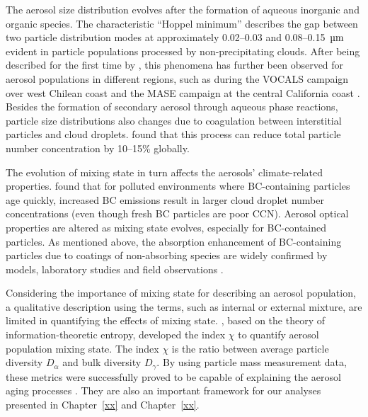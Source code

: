 \documentclass[edeposit,fullpage]{uiucthesis2009}
\begin{document}
The aerosol size distribution evolves after the formation of aqueous
inorganic and organic species. The characteristic ``Hoppel minimum''
describes the gap between two particle distribution modes at
approximately 0.02--0.03 and 0.08--0.15~$\rm \mu m$
\citet{hoppel1986effect} evident in particle populations processed by
non-precipitating clouds. After being described for the first time by
\citet{hoppel1985effect}, this phenomena has further been observed for
aerosol populations in different regions, such as during the VOCALS
campaign over west Chilean coast and the MASE campaign at the central
California coast \citep{kleinman2012aerosol, hudson2015cloud}. Besides
the formation of secondary aerosol through aqueous phase reactions,
particle size distributions also changes due to coagulation between
interstitial particles and cloud
droplets. \citet{pierce2015importance} found that this process can
reduce total particle number concentration by 10--15\% globally.

The evolution of mixing state in turn affects the aerosols'
climate-related properties. \citet{Ching2016} found that for polluted
environments where BC-containing particles age quickly, increased BC
emissions result in larger cloud droplet number concentrations (even
though fresh BC particles are poor CCN). Aerosol optical properties
are altered as mixing state evolves, especially for BC-contained
particles. As mentioned above, the absorption enhancement of
BC-containing particles due to coatings of non-absorbing species are
widely confirmed by models, laboratory studies and field observations
\citep{Moffet2009,Liu2017,wu2020light,Fierce2020}.

Considering the importance of mixing state for describing an aerosol
population, a qualitative description using the terms, such as
internal or external mixture, are limited in quantifying the effects
of mixing state. \citet{Riemer2013a}, based on the theory of
information-theoretic entropy, developed the index $\chi$ to quantify
aerosol population mixing state. The index $\chi$ is the ratio between
average particle diversity $D_{\alpha}$ and bulk diversity
$D_{\gamma}$. By using particle mass measurement data, these metrics
were successfully proved to be capable of explaining the aerosol aging
processes \citep{Healy2014}. They are also an important framework for
our analyses presented in Chapter~\ref{xx} and Chapter~\ref{xx}.
\end{document}

